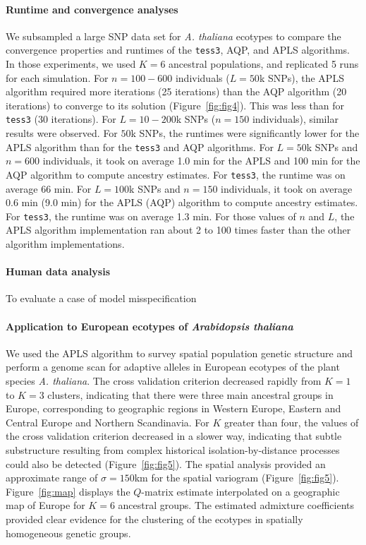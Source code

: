 \paragraph{Runtime and convergence analyses} We subsampled a large SNP data set
for {\it A. thaliana} ecotypes to compare the convergence properties and
runtimes of the {\tt tess3}, AQP, and APLS algorithms. In those experiments, we
used $K = 6$ ancestral populations, and replicated 5 runs for each simulation.
For $n = 100-600$ individuals ($L = 50$k SNPs), the APLS algorithm required more
iterations (25 iterations) than the AQP algorithm (20 iterations) to converge to
its solution (Figure~\ref{fig:fig4}). This was less than for {\tt tess3} (30 iterations). For
$L = 10-200$k SNPs ($n = 150$ individuals), similar results were observed. For
$50$k SNPs, the runtimes were significantly lower for the APLS algorithm than
for the {\tt tess3} and AQP algorithms. For $L = 50$k SNPs and $n = 600$
individuals, it took on average 1.0 min for the APLS and 100 min for the AQP
algorithm to compute ancestry estimates. For {\tt tess3}, the runtime was on
average 66 min. For $L = 100$k SNPs and $n = 150$ individuals, it took on
average 0.6 min (9.0 min) for the APLS (AQP) algorithm to compute ancestry
estimates. For {\tt tess3}, the runtime was on average 1.3 min. For those
values of $n$ and $L$, the APLS algorithm implementation ran about 2 to 100
times faster than the other algorithm implementations.
 
\paragraph{Human data analysis} To evaluate a case of model misspecification
 
\paragraph{Application to European ecotypes of {\it Arabidopsis thaliana}} We
used the APLS algorithm to survey spatial population genetic structure and
perform a genome scan for adaptive alleles in European ecotypes of the plant
species {\it A. thaliana}. The cross validation criterion decreased rapidly from
$K=1$ to $K=3$ clusters, indicating that there were three main ancestral groups
in Europe, corresponding to geographic regions in Western Europe, Eastern and
Central Europe and Northern Scandinavia. For $K$ greater than four, the values
of the cross validation criterion decreased in a slower way, indicating that
subtle substructure resulting from complex historical isolation-by-distance
processes could also be detected (Figure~\ref{fig:fig5}). The spatial analysis provided an
approximate range of $\sigma = 150$km for the spatial variogram (Figure~\ref{fig:fig5}).
Figure~\ref{fig:map} displays the $Q$-matrix estimate interpolated on a geographic map of
Europe for $K = 6$ ancestral groups. The estimated admixture coefficients
provided clear evidence for the clustering of the ecotypes in spatially
homogeneous genetic groups.

